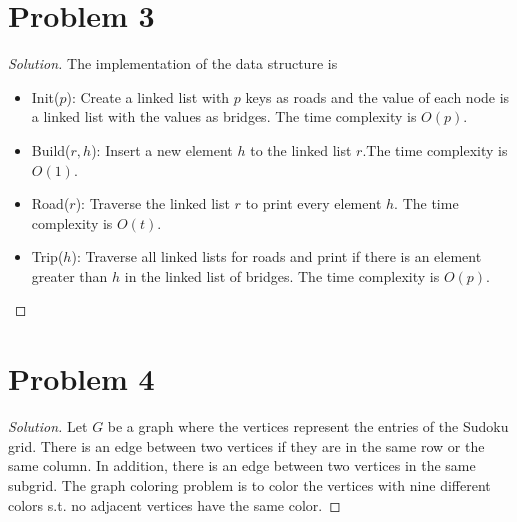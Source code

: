 \documentclass[12pt]{article}
\newenvironment*{solution}{\begin{proof}[Solution]}{\end{proof}}
\begin{document}
\section*{Problem 3}
\begin{solution}
    The implementation of the data structure is
    \begin{itemize}
        \item Init(\(p\)): Create a linked list with \(p\) keys as roads and
        the value of each node is a linked list with the values as bridges.
        The time complexity is \(O(p)\).
        \item Build(\(r, h\)): Insert a new element \(h\) to the linked list
        \(r\).The time complexity is \(O(1)\).
        \item Road(\(r\)): Traverse the linked list \(r\) to print every
        element \(h\). The time complexity is \(O(t)\).
        \item Trip(\(h\)): Traverse all linked lists for roads and print if
        there is an element greater than \(h\) in the linked list of bridges.
        The time complexity is \(O(p)\).
    \end{itemize}
\end{solution}
\section*{Problem 4}
\begin{solution}
    Let \(G\) be a graph where the vertices represent the entries of the
    Sudoku grid. There is an edge between two vertices if they are in the same
    row or the same column. In addition, there is an edge between two vertices
    in the same subgrid. The graph coloring problem is to color the vertices
    with nine different colors s.t. no adjacent vertices have the same color.
\end{solution}
\end{document}
